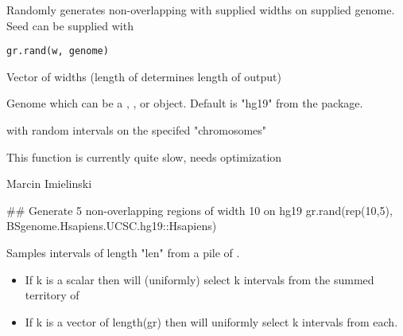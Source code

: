 \documentclass[a4paper]{book}
\begin{document}
%
\begin{Description}\relax
Randomly generates non-overlapping  with supplied widths on supplied genome.
Seed can be supplied with 
\end{Description}
%
\begin{Usage}
\begin{verbatim}
gr.rand(w, genome)
\end{verbatim}
\end{Usage}
%
\begin{Arguments}
\begin{ldescription}
\item[\code{w}] Vector of widths (length of  determines length of output)

\item[\code{genome}] Genome which can be a , , or  object. Default is "hg19" from the  package.
\end{ldescription}
\end{Arguments}
%
\begin{Value}
 with random intervals on the specifed "chromosomes"
\end{Value}
%
\begin{Note}\relax
This function is currently quite slow, needs optimization
\end{Note}
%
\begin{Author}\relax
Marcin Imielinski
\end{Author}
%
\begin{Examples}
\begin{ExampleCode}
## Generate 5 non-overlapping regions of width 10 on hg19
gr.rand(rep(10,5), BSgenome.Hsapiens.UCSC.hg19::Hsapiens)
\end{ExampleCode}
\end{Examples}
%
\begin{Description}\relax
Samples  intervals of length "len" from a pile of .
\begin{itemize}

\item If k is a scalar then will (uniformly) select k intervals from the summed territory of 
\item If k is a vector of length(gr) then will uniformly select k intervals from each.

\end{itemize}

\end{Description}
\end{document}
